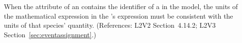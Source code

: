 When the  attribute of an \EventAssignment
contains the identifier of a \Species in the model, the
units of the mathematical expression in the
\EventAssignment's  expression must be
consistent with the units of that species' quantity.
(References: L2V2 Section~4.14.2; L2V3 Section~\ref{sec:eventassignment}.)

